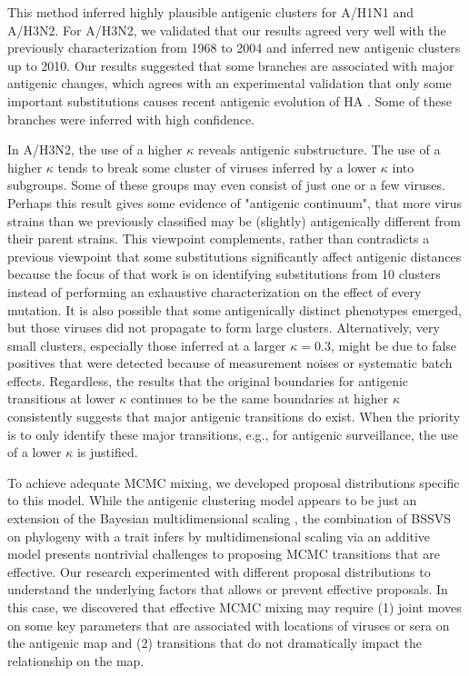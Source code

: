 \documentclass[11pt,oneside,letterpaper]{article}
\begin{document}
This method inferred highly plausible antigenic clusters for A/H1N1 and A/H3N2. 
For  A/H3N2, we validated that our results agreed very well with the previously characterization from 1968 to 2004 \cite{smith_mapping_2004} and inferred new antigenic clusters up to 2010. 
Our results suggested that some branches are associated with major antigenic changes, which agrees with an experimental validation that only some important substitutions causes recent antigenic evolution of HA \cite{koel_substitutions_2013}. 
Some of these branches were inferred with high confidence. 


In A/H3N2, the use of a higher $\kappa$ reveals antigenic substructure. 
The use of a higher $\kappa$ tends to break some cluster of viruses inferred by a lower $\kappa$ into subgroups. 
Some of these groups may even consist of just one or a few viruses. 
Perhaps this result gives some evidence of "antigenic continuum", that more virus strains than we previously classified may be (slightly) antigenically different from their parent strains. 
This viewpoint complements, rather than contradicts a previous viewpoint that some substitutions significantly affect antigenic distances \cite{koel_substitutions_2013} because the focus of that work is on identifying substitutions from 10 clusters instead of performing an exhaustive characterization on the effect of every mutation. 
It is also possible that some antigenically distinct phenotypes emerged, but those viruses did not propagate to form large clusters.
Alternatively, very small clusters, especially those inferred at a larger $\kappa=0.3$, might be due to false positives that were detected because of measurement noises or systematic batch effects.
Regardless, the results that the original boundaries for antigenic transitions at lower $\kappa$ continues to be the same boundaries at higher $\kappa$ consistently suggests that major antigenic transitions do exist. 
When the priority is to only identify these major transitions, e.g., for antigenic surveillance, the use of a lower $\kappa$ is justified.  


To achieve adequate MCMC mixing, we developed proposal distributions specific to this model. 
While the antigenic clustering model appears to be just an extension of the Bayesian multidimensional scaling \cite{bedford_integrating_2014}, the combination of BSSVS on phylogeny with a trait infers by multidimensional scaling via an additive model presents nontrivial challenges to proposing MCMC transitions that are effective. 
Our research experimented with different proposal distributions to understand the underlying factors that allows or prevent effective proposals. 
In this case, we discovered that effective MCMC mixing may require (1) joint moves on some key parameters that are associated with locations of viruses or sera on the antigenic map and (2) transitions that do not dramatically impact the relationship on the map.
\end{document}
